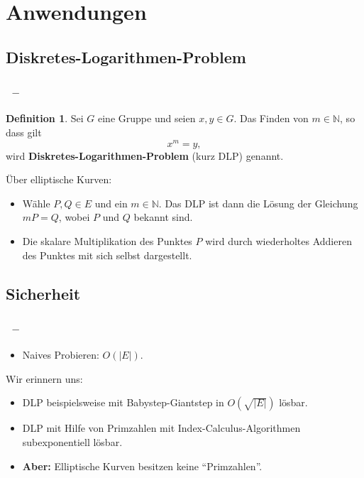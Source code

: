 \documentclass{beamer}
\theoremstyle{plain}
\theoremstyle{definition}
\newtheorem{defn}[thm]{Definition}
\theoremstyle{rem}
\begin{document}

\section{Anwendungen}
\subsection{Diskretes-Logarithmen-Problem}

\begin{frame}
    \frametitle{\insertsection~--~\insertsubsection}
    \begin{defn} \label{DLP}
        Sei $G$ eine Gruppe und seien $x,y \in G$. Das Finden von $m \in \mathbb{N}$, so dass gilt
        \begin{equation*}
            x^m = y,
        \end{equation*}
        wird \textbf{Diskretes-Logarithmen-Problem} (kurz DLP) genannt.
    \end{defn}
    \pause
    Über elliptische Kurven:
    \begin{itemize}[<+->]
        \item Wähle $P,Q \in E$ und ein $m \in \mathbb{N}$. Das DLP ist dann die Lösung der Gleichung $mP = Q$, wobei $P$ und $Q$ bekannt sind.
        \item Die skalare Multiplikation des Punktes $P$ wird durch wiederholtes Addieren des Punktes mit sich selbst dargestellt.
    \end{itemize}

\end{frame}

\subsection{Sicherheit}

\begin{frame}
    \frametitle{\insertsection~--~\insertsubsection}
    \begin{itemize}
        \item Naives Probieren: $O(|E|)$.
    \end{itemize}
    \pause
    Wir erinnern uns:
    \begin{itemize}[<+->]
        \item DLP beispielsweise mit Babystep-Giantstep in $O(\sqrt{|E|})$ lösbar.
        \item DLP mit Hilfe von Primzahlen mit Index-Calculus-Algorithmen subexponentiell lösbar.
        \item[] \textbf{Aber:} Elliptische Kurven besitzen keine ``Primzahlen''.
    \end{itemize}
\end{frame}
\end{document}
